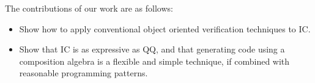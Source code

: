 The contributions of our work are as follows:
\begin{itemize}
\item
Show how to apply conventional object oriented verification techniques to IC.
\item
Show that IC is as expressive as QQ, and that
generating code using a composition algebra
is a flexible and simple technique, if combined with
reasonable programming patterns.
\end{itemize}


